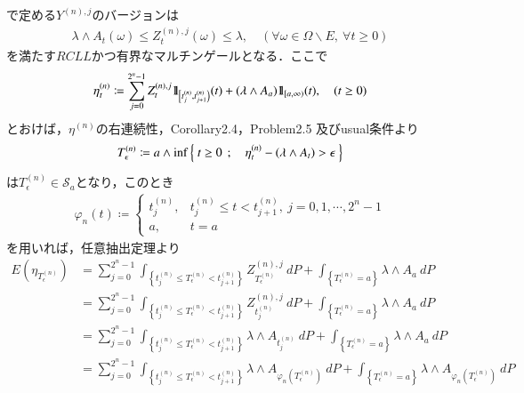 \begin{prf}
\begin{description}
				で定める$Y^{(n),j}$のバージョンは
				\begin{align}
					\lambda \wedge A_t(\omega) 
					\leq Z^{(n),j}_t(\omega) \leq \lambda,
					\quad (\forall \omega \in \Omega \backslash E,\ \forall t \geq 0)
				\end{align}
				を満たす$RCLL$かつ有界なマルチンゲールとなる．ここで
				\begin{align}
					\eta^{(n)}_t \coloneqq
					\sum_{j=0}^{2^n-1} Z^{(n),j}_t \mbox{1}\hspace{-0.25em}\mbox{l}_{\left[t^{(n)}_j,t^{(n)}_{j+1}\right)}(t)
						+ (\lambda \wedge A_a) \mbox{1}\hspace{-0.25em}\mbox{l}_{[a,\infty)}(t),
					\quad (t \geq 0)
				\end{align}
				とおけば，$\eta^{(n)}$の右連続性，Corollary2.4，Problem2.5 及びusual条件より
				\begin{align}
					T^{(n)}_\epsilon \coloneqq
					a \wedge \operatorname*{inf}_{} \left\{\ t \geq 0\ \, ; \quad \eta^{(n)}_t - (\lambda \wedge A_t) > \epsilon\ \right\}
				\end{align}
				は$T^{(n)}_\epsilon \in \mathscr{S}_a$となり，このとき
				\begin{align}
					\varphi_n(t) \coloneqq 
					\begin{cases}
						t^{(n)}_j, & t^{(n)}_j \leq t < t^{(n)}_{j+1},\ j=0,1,\cdots,2^n-1 \\
						a, & t = a
					\end{cases}
				\end{align}
				を用いれば，任意抽出定理より
				\begin{align}
					E\left( \eta_{T^{(n)}_\epsilon} \right)
					&= \sum_{j=0}^{2^n-1} \int_{\left\{t^{(n)}_j \leq T^{(n)}_\epsilon < t^{(n)}_{j+1}\right\}} Z^{(n),j}_{T^{(n)}_\epsilon}\ dP
						+ \int_{\left\{T^{(n)}_\epsilon = a\right\}} \lambda \wedge A_a\ dP \\
					&= \sum_{j=0}^{2^n-1} \int_{\left\{t^{(n)}_j \leq T^{(n)}_\epsilon < t^{(n)}_{j+1}\right\}} Z^{(n),j}_{t^{(n)}_j}\ dP
						+ \int_{\left\{T^{(n)}_\epsilon = a\right\}} \lambda \wedge A_a\ dP \\
					&= \sum_{j=0}^{2^n-1} \int_{\left\{t^{(n)}_j \leq T^{(n)}_\epsilon < t^{(n)}_{j+1}\right\}} \lambda \wedge A_{t^{(n)}_j}\ dP
						+ \int_{\left\{T^{(n)}_\epsilon = a\right\}} \lambda \wedge A_a\ dP \\
					&= \sum_{j=0}^{2^n-1} \int_{\left\{t^{(n)}_j \leq T^{(n)}_\epsilon < t^{(n)}_{j+1}\right\}} \lambda \wedge A_{\varphi_n\left(T^{(n)}_\epsilon\right)}\ dP
						+ \int_{\left\{T^{(n)}_\epsilon = a\right\}} \lambda \wedge A_{\varphi_n\left(T^{(n)}_\epsilon\right)}\ dP \\

\end{align}
\end{description}
\end{prf}
